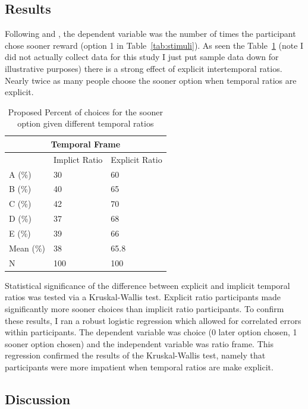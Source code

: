 \documentclass[]{article}
\begin{document}
\subsection{Results}

Following  and , the dependent variable was the number of times the participant chose sooner reward (option 1 in Table~\ref{tab:stimuli}). 
As seen the Table~\ref{tab:study1results} (note I did not actually collect data for this study I just put sample data down for illustrative purposes) there is a strong effect of explicit intertemporal ratios. 
Nearly twice as many people choose the sooner option when temporal ratios are explicit.




\begin{table}[!ht]
	\caption{Proposed Percent of choices for the sooner option given different temporal ratios} 
	\label{tab:study1results}
\begin{tabular}{ p{3cm}||p{3cm}|p{3cm}  }
	\multicolumn{3}{|c|}{Temporal Frame} \\
	\hline
	 & Implict Ratio & Explicit Ratio\\
	\hline
	A (\%)	 & 30  & 60\\
	B (\%) 	 & 40  & 65   \\
	C (\%) 	 & 42  & 70\\
	D (\%)   & 37  & 68\\
	E (\%)   & 39  & 66\\
	Mean (\%) & 38  & 65.8 \\
	N  	 & 100  & 100\\
	\hline
	
\end{tabular}
\end{table}

Statistical significance of  the difference between explicit and implicit temporal ratios was tested via a Kruskal-Wallis test.
Explicit ratio participants made significantly more sooner choices than implicit ratio participants. 
To confirm these results, I ran a robust logistic regression which allowed for correlated errors within participants.
The dependent variable was choice (0 later option chosen, 1 sooner option chosen) and the independent variable was ratio frame. 
This regression confirmed the results of the Kruskal-Wallis test, namely that participants were more impatient when temporal ratios are make explicit. 
 
\subsection{Discussion}
\end{document}
